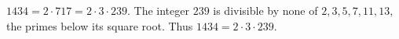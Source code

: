 $1434=2\cdot717=2\cdot3\cdot239$. The integer $239$ is divisible by none of $2,3,5,7,11,13$, the primes below its square root. Thus $\boxed{1434=2\cdot3\cdot239}$.
